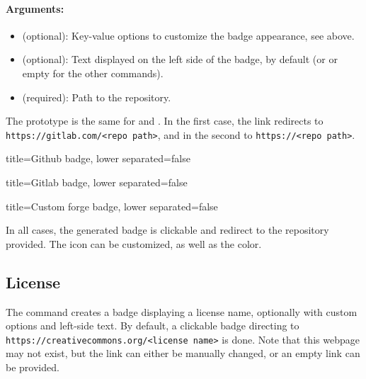 \paragraph{Arguments:}
\begin{itemize}
    \item \mintex{[<options>]} (optional): Key-value options to customize the badge appearance, see above.
    \item {} (optional): Text displayed on the left side of the badge, by default  (or  or empty for the other commands).
    \item {} (required): Path to the repository.
\end{itemize}

The prototype is the same for \mintex{\gitlabBadge} and \mintex{\forgeBadge}.
In the first case, the link redirects to \texttt{https://gitlab.com/<repo path>},
and in the second to \texttt{https://<repo path>}.


\begin{tcblisting}{title={Github badge}, lower separated=false}
\end{tcblisting}

\begin{tcblisting}{title={Gitlab badge}, lower separated=false}
\end{tcblisting}

\begin{tcblisting}{title={Custom forge badge}, lower separated=false}
\end{tcblisting}

In all cases, the generated badge is clickable and redirect to the repository provided.
The icon can be customized, as well as the color.

\subsection{License}


The \mintex{\licenseBadge} command creates a badge displaying a license name, optionally with custom options and left-side text.
By default, a clickable badge directing to \texttt{https://creativecommons.org/<license name>} is done.
Note that this webpage may not exist, but the link can either be manually changed, or an empty link can be provided.

